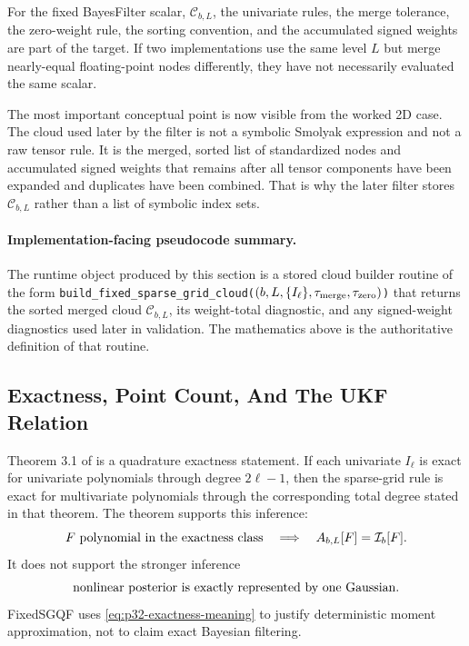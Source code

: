 \documentclass[11pt]{article}
\numberwithin{equation}{section}
\begin{document}
For the fixed BayesFilter scalar, \(\mathcal C_{b,L}\), the univariate
rules, the merge tolerance, the zero-weight rule, the sorting convention, and
the accumulated signed weights are part of the target.  If two implementations
use the same level \(L\) but merge nearly-equal floating-point nodes
differently, they have not necessarily evaluated the same scalar.

The most important conceptual point is now visible from the worked 2D case.
The cloud used later by the filter is not a symbolic Smolyak expression and not
a raw tensor rule.  It is the merged, sorted list of standardized nodes and
accumulated signed weights that remains after all tensor components have been
expanded and duplicates have been combined.  That is why the later filter stores
\(\mathcal C_{b,L}\) rather than a list of symbolic index sets.

\paragraph{Implementation-facing pseudocode summary.}
The runtime object produced by this section is a stored cloud builder routine of
the form \texttt{build\_fixed\_sparse\_grid\_cloud(}$(b,L,\{I_\ell\},\tau_{\rm merge},\tau_{\rm zero})$\texttt{)}
that returns the sorted merged cloud \(\mathcal C_{b,L}\), its weight-total
diagnostic, and any signed-weight diagnostics used later in validation.  The
mathematics above is the authoritative definition of that routine.

\subsection{Exactness, Point Count, And The UKF Relation}
\label{subsec:p32-source-theorems}

Theorem 3.1 of \citet{jia2012sparsegrid} is a quadrature exactness statement.
If each univariate \(I_\ell\) is exact for univariate polynomials through
degree \(2\ell-1\), then the sparse-grid rule is exact for multivariate
polynomials through the corresponding total degree stated in that theorem.
The theorem supports this inference:
\begin{equation}
  F\ \hbox{polynomial in the exactness class}
  \quad\Longrightarrow\quad
  A_{b,L}[F]=\mathcal I_b[F].
  \label{eq:p32-exactness-meaning}
\end{equation}
It does not support the stronger inference
\[
  \hbox{nonlinear posterior is exactly represented by one Gaussian}.
\]
FixedSGQF uses \eqref{eq:p32-exactness-meaning} to justify deterministic
moment approximation, not to claim exact Bayesian filtering.
\end{document}
